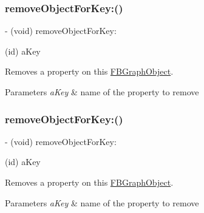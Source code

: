 \subsubsection{\texorpdfstring{remove\+Object\+For\+Key\+:()}{removeObjectForKey:()}\hspace{0.1cm}{\footnotesize\ttfamily [4/5]}}
{\footnotesize\ttfamily -\/ (void) remove\+Object\+For\+Key\+: \begin{DoxyParamCaption}\item[{(id)}]{a\+Key }\end{DoxyParamCaption}}

Removes a property on this {\ttfamily \hyperlink{interfaceFBGraphObject}{F\+B\+Graph\+Object}}.


\begin{DoxyParams}{Parameters}
{\em a\+Key} & name of the property to remove \\
\hline
\end{DoxyParams}
\mbox{\label{protocolFBGraphObject-p_ae70776266993262a70b438421f1e0209}} 
\subsubsection{\texorpdfstring{remove\+Object\+For\+Key\+:()}{removeObjectForKey:()}\hspace{0.1cm}{\footnotesize\ttfamily [5/5]}}
{\footnotesize\ttfamily -\/ (void) remove\+Object\+For\+Key\+: \begin{DoxyParamCaption}\item[{(id)}]{a\+Key }\end{DoxyParamCaption}}

Removes a property on this {\ttfamily \hyperlink{interfaceFBGraphObject}{F\+B\+Graph\+Object}}.


\begin{DoxyParams}{Parameters}
{\em a\+Key} & name of the property to remove \\
\hline
\end{DoxyParams}
\mbox{\label{protocolFBGraphObject-p_a9b7573bc6e372ff8f4f33c3d144ea620}} 
